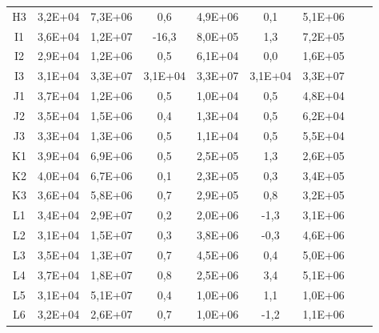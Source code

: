 \begin{center}
\begin{longtable}{ccccccccc}
H3    & 3,2E+04 & 7,3E+06 & 0,6   & 4,9E+06 & 0,1   & 5,1E+06 \\
I1    & 3,6E+04 & 1,2E+07 & -16,3 & 8,0E+05 & 1,3   & 7,2E+05 \\
I2    & 2,9E+04 & 1,2E+06 & 0,5   & 6,1E+04 & 0,0   & 1,6E+05 \\
I3    & 3,1E+04 & 3,3E+07 & 3,1E+04 & 3,3E+07 & 3,1E+04 & 3,3E+07 \\
J1    & 3,7E+04 & 1,2E+06 & 0,5   & 1,0E+04 & 0,5   & 4,8E+04 \\
J2    & 3,5E+04 & 1,5E+06 & 0,4   & 1,3E+04 & 0,5   & 6,2E+04 \\
J3    & 3,3E+04 & 1,3E+06 & 0,5   & 1,1E+04 & 0,5   & 5,5E+04 \\
K1    & 3,9E+04 & 6,9E+06 & 0,5   & 2,5E+05 & 1,3   & 2,6E+05 \\
K2    & 4,0E+04 & 6,7E+06 & 0,1   & 2,3E+05 & 0,3   & 3,4E+05 \\
K3    & 3,6E+04 & 5,8E+06 & 0,7   & 2,9E+05 & 0,8   & 3,2E+05 \\
L1    & 3,4E+04 & 2,9E+07 & 0,2   & 2,0E+06 & -1,3  & 3,1E+06 \\
L2    & 3,1E+04 & 1,5E+07 & 0,3   & 3,8E+06 & -0,3  & 4,6E+06 \\
L3    & 3,5E+04 & 1,3E+07 & 0,7   & 4,5E+06 & 0,4   & 5,0E+06 \\
L4    & 3,7E+04 & 1,8E+07 & 0,8   & 2,5E+06 & 3,4   & 5,1E+06 \\
L5    & 3,1E+04 & 5,1E+07 & 0,4   & 1,0E+06 & 1,1   & 1,0E+06 \\
L6    & 3,2E+04 & 2,6E+07 & 0,7   & 1,0E+06 & -1,2  & 1,1E+06 \\
\end{longtable}
\end{center}


